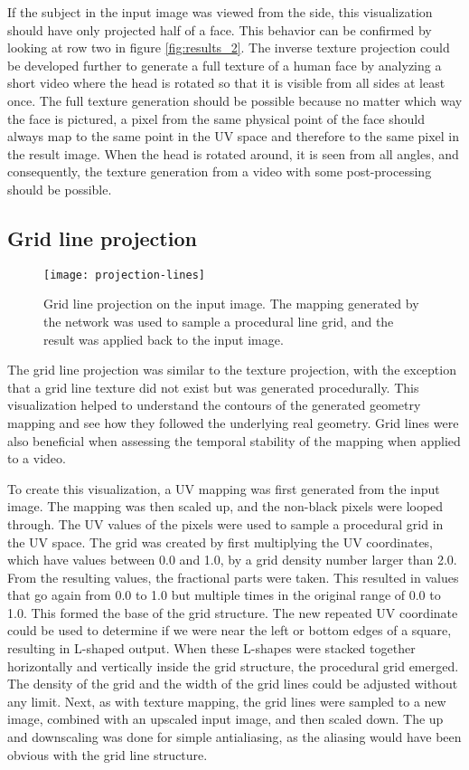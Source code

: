 If the subject in the input image was viewed from the side, this visualization should have only projected half of a face. This behavior can be confirmed by looking at row two in figure \ref{fig:results_2}. The inverse texture projection could be developed further to generate a full texture of a human face by analyzing a short video where the head is rotated so that it is visible from all sides at least once. The full texture generation should be possible because no matter which way the face is pictured, a pixel from the same physical point of the face should always map to the same point in the UV space and therefore to the same pixel in the result image. When the head is rotated around, it is seen from all angles, and consequently, the texture generation from a video with some post-processing should be possible.

\subsection{Grid line projection}

\begin{figure}
    \texttt{[image: projection-lines]}
    \caption[Grid line projection]{Grid line projection on the input image. The mapping generated by the network was used to sample a procedural line grid, and the result was applied back to the input image.}
    \label{fig:projection_lines_1}
\end{figure}

The grid line projection was similar to the texture projection, with the exception that a grid line texture did not exist but was generated procedurally. This visualization helped to understand the contours of the generated geometry mapping and see how they followed the underlying real geometry. Grid lines were also beneficial when assessing the temporal stability of the mapping when applied to a video.

To create this visualization, a UV mapping was first generated from the input image. The mapping was then scaled up, and the non-black pixels were looped through. The UV values of the pixels were used to sample a procedural grid in the UV space. The grid was created by first multiplying the UV coordinates, which have values between 0.0 and 1.0, by a grid density number larger than 2.0. From the resulting values, the fractional parts were taken. This resulted in values that go again from 0.0 to 1.0 but multiple times in the original range of 0.0 to 1.0. This formed the base of the grid structure. The new repeated UV coordinate could be used to determine if we were near the left or bottom edges of a square, resulting in L-shaped output. When these L-shapes were stacked together horizontally and vertically inside the grid structure, the procedural grid emerged. The density of the grid and the width of the grid lines could be adjusted without any limit. Next, as with texture mapping, the grid lines were sampled to a new image, combined with an upscaled input image, and then scaled down. The up and downscaling was done for simple antialiasing, as the aliasing would have been obvious with the grid line structure.

